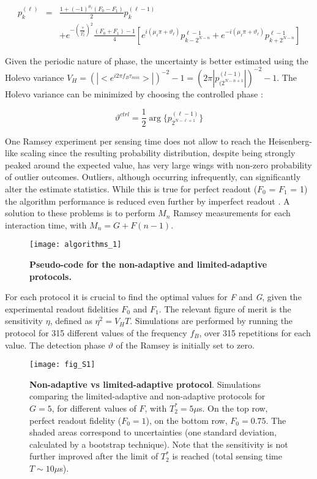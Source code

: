 \begin{eqnarray}
p_k^{(\ell)} &=& \frac{1 + (-1)^{\mu_{\ell}}(F_0-F_1)}{2}p_k^{(\ell-1)}\\
\nonumber
& &+e^{-(\frac{\tau}{T_2^*})^2} \frac{(F_0+F_1)-1}{4}[e^{i(\mu_{\ell}\pi+\vartheta_{\ell})}p^{\ell-1}_{k-2^{N-n}}+e^{-i(\mu_{\ell}\pi+\vartheta_{\ell})}p^{\ell-1}_{k+2^{N-n}}]
\end{eqnarray}


Given the periodic nature of phase, the uncertainty is better estimated using the Holevo variance $V_H = (|<e^{i 2 \pi f_B \tau_{min}} >|)^{-2}-1 = ( 2 \pi|p_{(2^{N-n+1}}^{(l-1)} |)^{-2}-1$. The Holevo variance can be minimized by choosing the controlled phase \cite{Cappellaro_Phys.Rev.A_2012}:

\begin{equation}
\vartheta^{ctrl} = \frac{1}{2}\arg\{ p_{2^{N-\ell+1}}^{(\ell - 1)}\}
\end{equation}

One Ramsey experiment per sensing time does not allow to reach the Heisenberg-like scaling since the resulting probability distribution, despite being strongly peaked around the expected value, has very large wings with non-zero probability of outlier outcomes. Outliers, although occurring infrequently, can significantly alter the estimate statistics. While this is true for perfect readout ($F_0$ = $F_1$ = 1) the algorithm performance is  reduced even further by imperfect readout \cite{Said_Phys.Rev.B_2011}. A solution to these problems is to perform $M_n$ Ramsey measurements for each interaction time\cite{Said_Phys.Rev.B_2011}, with $M_n = G + F(n-1)$. 
\begin{figure*}
	\centering
	\texttt{[image: algorithms\_1]}
	\caption{\label{fig:ammA1} \textbf{Pseudo-code for the non-adaptive and limited-adaptive protocols.}}
\end{figure*}

For each protocol it is crucial to find the optimal values for \textit{F} and \textit{G}, given the experimental readout fidelities $F_0$ and $F_1$. The relevant figure of merit is the sensitivity $\eta$, defined as $\eta^2 = V_H T$.
Simulations are performed by running the protocol for 315 different values of the frequency $f_B$, over 315 repetitions for each value. The detection phase $\vartheta$ of the Ramsey is initially set to zero.

\begin{figure*}
	\centering
	\texttt{[image: fig\_S1]}
	\caption{\label{fig:ammS1} \textbf{Non-adaptive vs limited-adaptive protocol}. Simulations comparing the limited-adaptive and non-adaptive protocols for $G = 5$, for different values of $F$, with $T_2^* = 5\mu$s. On the top row, perfect readout fidelity ($F_0 = 1$), on the bottom row, $F_0 = 0.75$. The shaded areas correspond to uncertainties (one standard deviation, calculated by a bootstrap technique). Note that the sensitivity is not further improved after the limit of $T_2^*$  is reached (total sensing time $T \sim 10\mu$s).
	}
\end{figure*}

